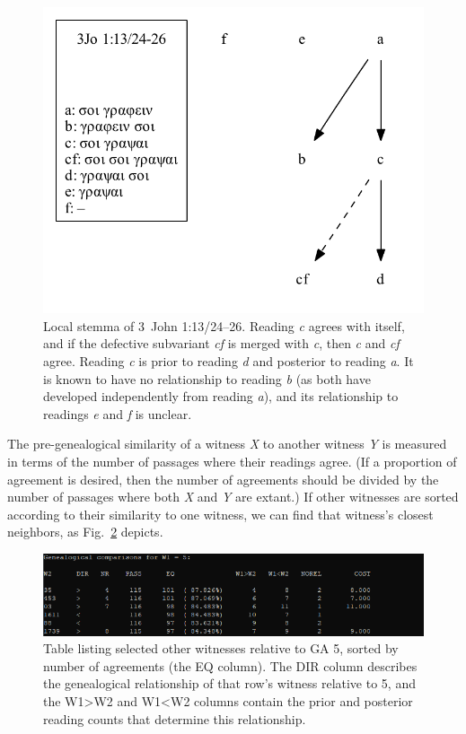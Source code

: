 \documentclass[a4paper, 12pt]{article}
\begin{document}
	\begin{figure}[h!]
		\centering
		\includegraphics[scale=0.6666]{../graphics/B25K1V13U24-26-local-stemma.pdf}
		\caption{Local stemma of 3~John 1:13/24–26. Reading \emph{c} agrees with itself, and if the defective subvariant \emph{cf} is merged with \emph{c}, then \emph{c} and \emph{cf} agree. Reading \emph{c} is prior to reading \emph{d} and posterior to reading \emph{a}. It is known to have no relationship to reading \emph{b} (as both have developed independently from reading \emph{a}), and its relationship to readings \emph{e} and \emph{f} is unclear.}
		\label{fig:genealogical-relationships}
	\end{figure}
	
	\newpage
	
	The pre-genealogical similarity of a witness \emph{X} to another witness \emph{Y} is measured in terms of the number of passages where their readings agree. (If a proportion of agreement is desired, then the number of agreements should be divided by the number of passages where both \emph{X} and \emph{Y} are extant.) If other witnesses are sorted according to their similarity to one witness, we can find that witness's closest neighbors, as Fig.~\ref{fig:compare-witnesses} depicts.
	
	\begin{figure}[h!]
		\centering
		\includegraphics[width=\textwidth]{../graphics/compare-witnesses.png}
		\caption{Table listing selected other witnesses relative to GA 5, sorted by number of agreements (the \textsf{EQ} column). The \textsf{DIR} column describes the genealogical relationship of that row's witness relative to 5, and the \textsf{W1>W2} and \textsf{W1<W2} columns contain the prior and posterior reading counts that determine this relationship.}
		\label{fig:compare-witnesses}
	\end{figure}
	
\end{document}
